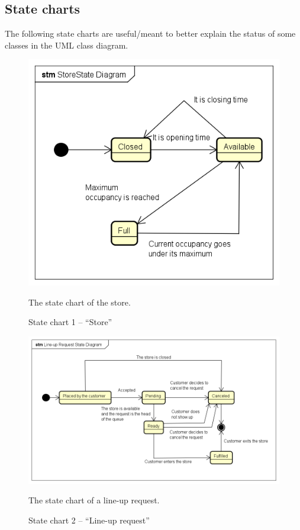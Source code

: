 \documentclass[a4paper,oneside,11pt]{book}   %
\newcommand{\captionrasd}[2]{\caption{#1}\par\begin{center}\vspace{-.01\textheight}\small#2.\end{center}}
\begin{document}
    \subsection{State charts}
    The following state charts are useful/meant to better explain the status of some classes in the UML class diagram.
    \begin{figure}[H]
        \centering
        \includegraphics[width=.6\textwidth, keepaspectratio]{pictures/state_diagrams/store}
        \captionrasd{State chart 1 -- ``Store''}{The state chart of the store}
        \label{figure:state_chart_1_store}
    \end{figure}
    \begin{figure}[H]
        \centering
        \includegraphics[width=.85\textwidth, keepaspectratio]{pictures/state_diagrams/line-up_request}
        \captionrasd{State chart 2 -- ``Line-up request''}{The state chart of a line-up request}
        \label{figure:state_chart_2_lineup_request}
    \end{figure}
\end{document}
